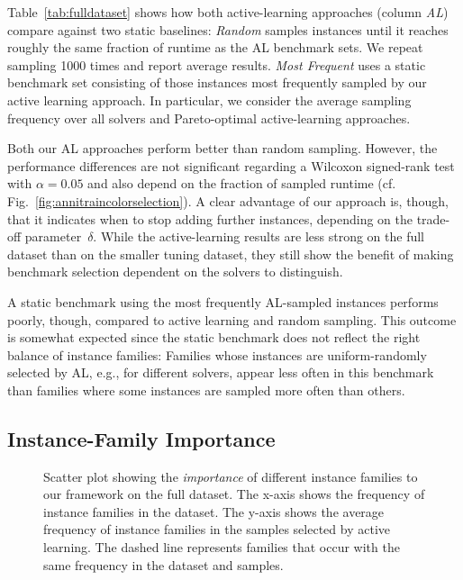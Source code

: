 \documentclass[sn-basic, Numbered]{sn-jnl} %
\begin{document}
Table~\ref{tab:fulldataset} shows how both active-learning approaches (column \emph{AL}) compare against two static baselines:
\emph{Random} samples instances until it reaches roughly the same fraction of runtime as the AL benchmark sets.
We repeat sampling 1000 times and report average results.
\emph{Most Frequent} uses a static benchmark set consisting of those instances most frequently sampled by our active learning approach.
In particular, we consider the average sampling frequency over all solvers and Pareto-optimal active-learning approaches.

Both our AL approaches perform better than random sampling.
However, the performance differences are not significant regarding a Wilcoxon signed-rank test with $\alpha = 0.05$ and also depend on the fraction of sampled runtime (cf. Fig.~\ref{fig:annitraincolorselection}).
A clear advantage of our approach is, though, that it indicates when to stop adding further instances, depending on the trade-off parameter~$\delta$.
While the active-learning results are less strong on the full dataset than on the smaller tuning dataset, they still show the benefit of making benchmark selection dependent on the solvers to distinguish.

A static benchmark using the most frequently AL-sampled instances performs poorly, though, compared to active learning and random sampling.
This outcome is somewhat expected since the static benchmark does not reflect the right balance of instance families:
Families whose instances are uniform-randomly selected by AL, e.g., for different solvers, appear less often in this benchmark than families where some instances are sampled more often than others.

\subsection{Instance-Family Importance}

\begin{figure}[tb]
  \centering
  \caption{
    Scatter plot showing the \emph{importance} of different instance families to our framework on the full dataset.
    The x-axis shows the frequency of instance families in the dataset.
    The y-axis shows the average frequency of instance families in the samples selected by active learning.
    The dashed line represents families that occur with the same frequency in the dataset and samples.
  }
  \label{fig:annifinalfamilies}
\end{figure}
\end{document}
